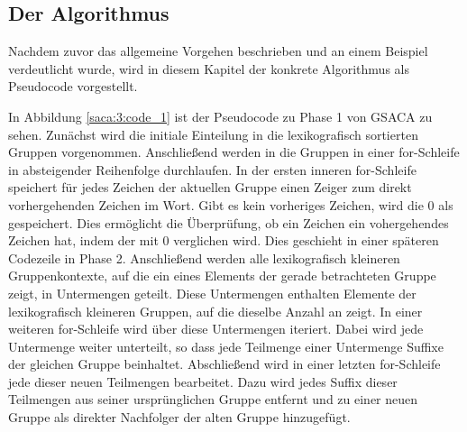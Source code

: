 \newpage
\subsection{Der Algorithmus}
\label{gsaca:chapter4}
%
Nachdem zuvor das allgemeine Vorgehen beschrieben und an einem Beispiel verdeutlicht wurde, wird in diesem Kapitel der konkrete Algorithmus als Pseudocode vorgestellt. 

In Abbildung \ref{saca:3:code_1} ist der Pseudocode zu Phase 1 von GSACA zu sehen.
Zunächst wird die initiale Einteilung in die lexikografisch sortierten Gruppen vorgenommen. 
Anschließend werden in die Gruppen in einer for-Schleife in absteigender Reihenfolge durchlaufen.
In der ersten inneren for-Schleife speichert für jedes Zeichen der aktuellen Gruppe einen Zeiger zum direkt vorhergehenden Zeichen im Wort.
Gibt es kein vorheriges Zeichen, wird die 0 als \prevpointer gespeichert. 
Dies ermöglicht die Überprüfung, ob ein Zeichen ein vohergehendes Zeichen hat, indem der \prevpointer mit 0 verglichen wird. 
Dies geschieht in einer späteren Codezeile in Phase 2. 
Anschließend werden alle lexikografisch kleineren Gruppenkontexte, auf die ein \prevpointer eines Elements der gerade betrachteten Gruppe zeigt, in Untermengen geteilt.
Diese Untermengen enthalten Elemente der lexikografisch kleineren Gruppen, auf die dieselbe Anzahl an \prevpointern zeigt.
In einer weiteren for-Schleife wird über diese Untermengen iteriert.
Dabei wird jede Untermenge weiter unterteilt, so dass jede Teilmenge einer Untermenge Suffixe der gleichen Gruppe beinhaltet.
Abschließend wird in einer letzten for-Schleife jede dieser neuen Teilmengen bearbeitet.
Dazu wird jedes Suffix dieser Teilmengen aus seiner ursprünglichen Gruppe entfernt und zu einer neuen Gruppe als direkter Nachfolger der alten Gruppe hinzugefügt.

\newpage

\newpage

